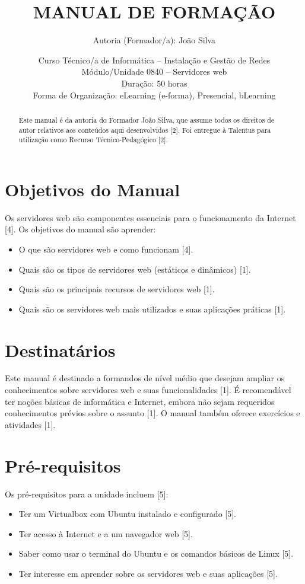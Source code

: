 \documentclass[12pt, a4paper]{article}
\title{\textbf{MANUAL DE FORMAÇÃO}}
\author{Autoria (Formador/a): João Silva} %
\date{Curso Técnico/a de Informática – Instalação e Gestão de Redes \\ 
	Módulo/Unidade 0840 – Servidores web \\
	Duração: 50 horas \\
	Forma de Organização: eLearning (e-forma), Presencial, bLearning} %
\begin{document}
	\maketitle
	
	\thispagestyle{empty} %
	
	\begin{abstract}
		Este manual é da autoria do Formador João Silva, que assume todos os direitos de autor relativos aos conteúdos aqui desenvolvidos [2]. Foi entregue à Talentus para utilização como Recurso Técnico-Pedagógico [2].
	\end{abstract}
	
	\newpage
	\tableofcontents %
	
	\newpage
	
	\section*{Objetivos do Manual}
	Os servidores web são componentes essenciais para o funcionamento da Internet [4]. Os objetivos do manual são aprender:
	\begin{itemize}
		\item O que são servidores web e como funcionam [4].
		\item Quais são os tipos de servidores web (estáticos e dinâmicos) [1].
		\item Quais são os principais recursos de servidores web [1].
		\item Quais são os servidores web mais utilizados e suas aplicações práticas [1].
	\end{itemize}
	
	\section*{Destinatários}
	Este manual é destinado a formandos de nível médio que desejam ampliar os conhecimentos sobre servidores web e suas funcionalidades [1]. É recomendável ter noções básicas de informática e Internet, embora não sejam requeridos conhecimentos prévios sobre o assunto [1]. O manual também oferece exercícios e atividades [1].
	
	\section*{Pré-requisitos}
	Os pré-requisitos para a unidade incluem [5]:
	\begin{itemize}
		\item Ter um Virtualbox com Ubuntu instalado e configurado [5].
		\item Ter acesso à Internet e a um navegador web [5].
		\item Saber como usar o terminal do Ubuntu e os comandos básicos de Linux [5].
		\item Ter interesse em aprender sobre os servidores web e suas aplicações [5].
	\end{itemize}
	
\end{document}
